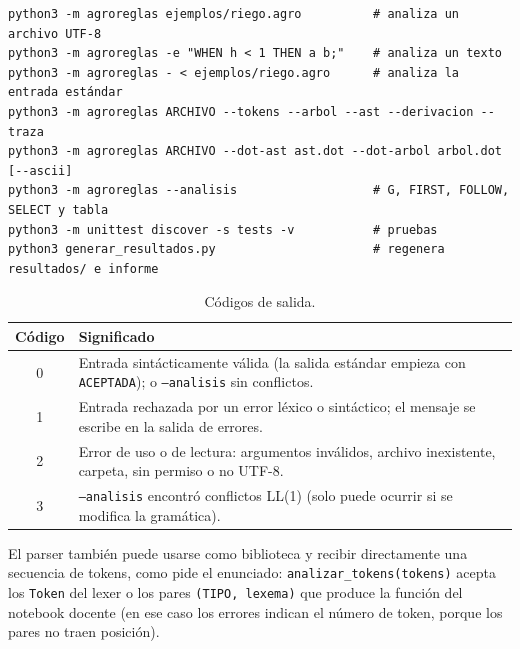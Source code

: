 \documentclass[11pt,letterpaper]{article}
\newcommand{\cod}[1]{\texttt{#1}}
\newcommand{\ruta}[1]{\nolinkurl{#1}}
\newcommand{\T}[1]{\texttt{#1}}
\newcommand{\cabeza}{\rowcolor{cabecera}}
\newenvironment{codigo}{\par\small\vspace{2pt}}{\par\vspace{2pt}}
\begin{document}
\begin{codigo}
\begin{verbatim}
python3 -m agroreglas ejemplos/riego.agro          # analiza un archivo UTF-8
python3 -m agroreglas -e "WHEN h < 1 THEN a b;"    # analiza un texto
python3 -m agroreglas - < ejemplos/riego.agro      # analiza la entrada estándar
python3 -m agroreglas ARCHIVO --tokens --arbol --ast --derivacion --traza
python3 -m agroreglas ARCHIVO --dot-ast ast.dot --dot-arbol arbol.dot [--ascii]
python3 -m agroreglas --analisis                   # G, FIRST, FOLLOW, SELECT y tabla
python3 -m unittest discover -s tests -v           # pruebas
python3 generar_resultados.py                      # regenera resultados/ e informe
\end{verbatim}
\end{codigo}

\begin{longtable}{c>{\raggedright\arraybackslash}p{14.4cm}}
\caption{Códigos de salida.}\\
\hline\cabeza \textbf{Código} & \textbf{Significado}\\\hline\endfirsthead
0 & Entrada sintácticamente válida (la salida estándar empieza con \T{ACEPTADA}); o \T{--analisis} sin conflictos.\\
1 & Entrada rechazada por un error léxico o sintáctico; el mensaje se escribe en la salida de errores.\\
2 & Error de uso o de lectura: argumentos inválidos, archivo inexistente, carpeta, sin permiso o no UTF-8.\\
3 & \T{--analisis} encontró conflictos LL(1) (solo puede ocurrir si se modifica la gramática).\\\hline
\end{longtable}

El parser también puede usarse como biblioteca y recibir directamente una secuencia de tokens, como pide el
enunciado: \ruta{analizar_tokens(tokens)} acepta los \cod{Token} del lexer o los pares \cod{(TIPO, lexema)} que
produce la función del notebook docente (en ese caso los errores indican el número de token, porque los pares no
traen posición).
\end{document}
